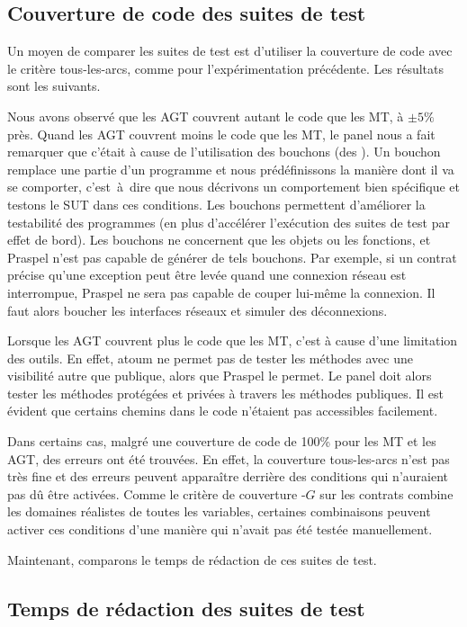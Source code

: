 \subsection{Couverture de code des suites de test}
\label{subsection:experimentation:coverage}

Un moyen de comparer les suites de test est d'utiliser la couverture de code
avec le critère tous-les-arcs, comme pour l'expérimentation précédente. Les
résultats sont les suivants.

Nous avons observé que les AGT couvrent autant le code que les MT, à $\pm 5\%$
près. Quand les AGT couvrent moins le code que les MT, le panel nous a fait
remarquer que c'était à cause de l'utilisation des bouchons (des
). Un bouchon remplace une partie d'un programme et nous
prédéfinissons la manière dont il va se comporter, c'est~à~dire que nous
décrivons un comportement bien spécifique et testons le SUT dans ces conditions.
Les bouchons permettent d'améliorer la testabilité des programmes (en plus
d'accélérer l'exécution des suites de test par effet de bord). Les bouchons ne
concernent que les objets ou les fonctions, et Praspel n'est pas capable de
générer de tels bouchons. Par exemple, si un contrat précise qu'une exception
peut être levée quand une connexion réseau est interrompue, Praspel ne sera pas
capable de couper lui-même la connexion. Il faut alors boucher les interfaces
réseaux et simuler des déconnexions.

Lorsque les AGT couvrent plus le code que les MT, c'est à cause d'une limitation
des outils. En effet, atoum ne permet pas de tester les méthodes avec une
visibilité autre que publique, alors que Praspel le permet. Le panel doit alors
tester les méthodes protégées et privées à travers les méthodes publiques. Il
est évident que certains chemins dans le code n'étaient pas accessibles
facilement.

Dans certains cas, malgré une couverture de code de 100\% pour les MT et les
AGT, des erreurs ont été trouvées. En effet, la couverture tous-les-arcs n'est
pas très fine et des erreurs peuvent apparaître derrière des conditions qui
n'auraient pas dû être activées. Comme le critère de couverture
-$G$ sur les contrats combine les domaines réalistes de toutes
les variables, certaines combinaisons peuvent activer ces conditions d'une
manière qui n'avait pas été testée manuellement.

Maintenant, comparons le temps de rédaction de ces suites de test.

\subsection{Temps de rédaction des suites de test}
\label{subsection:experimentation:time}


